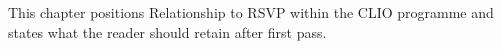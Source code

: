 This chapter positions Relationship to RSVP within the CLIO programme and states what the reader should retain after first pass.
